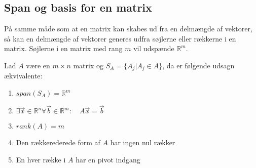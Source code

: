 \subsection{Span og basis for en matrix}
På samme måde som at en matrix kan skabes ud fra en delmængde af vektorer, så kan en delmængde af vektorer generes udfra søjlerne eller rækkerne i en matrix. 
Søjlerne i en matrix med rang $m$ vil udspænde $\mathds{R}^m$.
\begin{stn}
Lad $A$ være en $m\times n$ matrix og $S_A= \{A_j| A_j \in A\}$, da er følgende udsagn ækvivalente:
\begin{enumerate}[label=\alph*]
\item $span(S_A) = \mathds{R}^m$
\item $\exists \vec{x} \in \mathds{R}^n \forall \vec{b} \in \mathds{R}^m: \quad A\vec{x}=\vec{b}$
\item $rank(A) = m$
\item Den rækkerederede form af $A$ har ingen nul rækker
\item En hver række i $A$ har en pivot indgang
\end{enumerate}
\end{stn}
